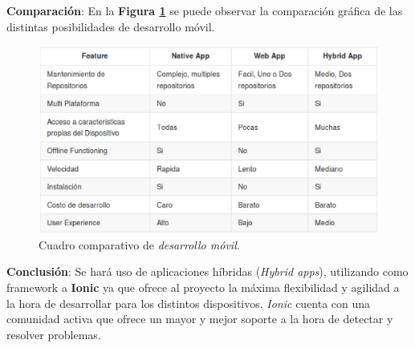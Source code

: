 \textbf{Comparación}:
En la \textbf{Figura \ref{appMobile}} se puede observar la comparación gráfica de las distintas posibilidades de desarrollo móvil.

\begin{figure}
  \centering
  \includegraphics[width=1\textwidth]{img/tp2_definicion/appMobile}
  \caption{Cuadro comparativo de \textit{desarrollo móvil}.}
  \label{appMobile}
\end{figure}

\textbf{Conclusión}:
Se hará uso de aplicaciones híbridas (\textit{Hybrid apps}), utilizando como framework a \textbf{Ionic} ya que ofrece al proyecto la máxima flexibilidad y agilidad a la hora de desarrollar para los distintos dispositivos.
\textit{Ionic} cuenta con una comunidad activa que ofrece un mayor y mejor soporte a la hora de detectar y resolver problemas.







